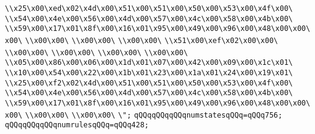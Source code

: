 \verb|\\x25\x00\xed\x02\x4d\x00\x51\x00\x51\x00\x50\x00\x53\x00\x4f\x00\|\newline
\verb|\\x54\x00\x4e\x00\x56\x00\x4d\x00\x57\x00\x4c\x00\x58\x00\x4b\x00\|\newline
\verb|\\x59\x00\x17\x01\x8f\x00\x16\x01\x95\x00\x49\x00\x96\x00\x48\x00\x00\x00\|\newline
\verb|\\x00\x00\|\newline
\verb|\\x00\x00\|\newline
\verb|\\x00\x00\|\newline
\verb|\\x51\x00\xef\x02\x00\x00\|\newline
\verb|\\x00\x00\|\newline
\verb|\\x00\x00\|\newline
\verb|\\x00\x00\|\newline
\verb|\\x00\x00\|\newline
\verb|\\x05\x00\x86\x00\x06\x00\x1d\x01\x07\x00\x42\x00\x09\x00\x1c\x01\|\newline
\verb|\\x10\x00\x54\x00\x22\x00\x1b\x01\x23\x00\x1a\x01\x24\x00\x19\x01\|\newline
\verb|\\x25\x00\xf2\x02\x4d\x00\x51\x00\x51\x00\x50\x00\x53\x00\x4f\x00\|\newline
\verb|\\x54\x00\x4e\x00\x56\x00\x4d\x00\x57\x00\x4c\x00\x58\x00\x4b\x00\|\newline
\verb|\\x59\x00\x17\x01\x8f\x00\x16\x01\x95\x00\x49\x00\x96\x00\x48\x00\x00\x00\|\newline
\verb|\\x00\x00\|\newline
\verb|\\x00\x00\|\newline
\verb|\";|\newline
\verb|qQQqqQQqqQQqnumstatesqQQq=qQQq756;|\newline
\verb|qQQqqQQqqQQqnumrulesqQQq=qQQq428;|\newline
